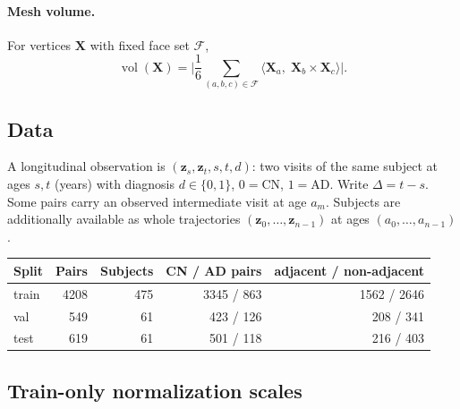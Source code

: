 \documentclass[11pt]{article}
\newcommand{\z}{\bm{z}}
\newcommand{\X}{\bm{X}}
\newcommand{\vol}{\operatorname{vol}}
\begin{document}
\paragraph{Mesh volume.} For vertices $\X$ with fixed face set $\mathcal{F}$,
\begin{equation}
  \vol(\X) = \Biggl| \frac{1}{6} \sum_{(a,b,c) \in \mathcal{F}}
    \bigl\langle \X_a,\; \X_b \times \X_c \bigr\rangle \Biggr| .
\end{equation}

\subsection{Data}

A longitudinal observation is $(\z_s, \z_t, s, t, d)$: two visits of the same subject at
ages $s, t$ (years) with diagnosis $d \in \{0,1\}$, $0 = \mathrm{CN}$, $1 = \mathrm{AD}$.
Write $\Delta = t - s$. Some pairs carry an observed intermediate visit at age $a_m$.
Subjects are additionally available as whole trajectories
$(\z_0, \dots, \z_{n-1})$ at ages $(a_0, \dots, a_{n-1})$.

\begin{center}
\begin{tabular}{lrrrr}
\toprule
Split & Pairs & Subjects & CN / AD pairs & adjacent / non-adjacent \\
\midrule
train & 4208 & 475 & 3345 / 863 & 1562 / 2646 \\
val   &  549 &  61 &  423 / 126 &  208 /  341 \\
test  &  619 &  61 &  501 / 118 &  216 /  403 \\
\bottomrule
\end{tabular}
\end{center}

\subsection{Train-only normalization scales}
\end{document}
